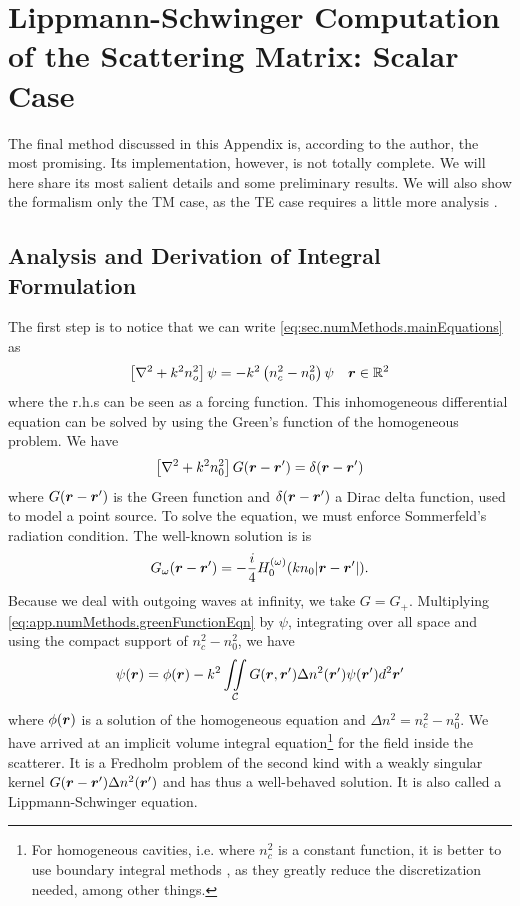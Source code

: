 \section{Lippmann-Schwinger Computation of the Scattering Matrix: Scalar Case}\label{sec:app.numTools.lippmannSchwinger}
The final method discussed in this Appendix is, according to the author, the most
promising. Its implementation, however, is not totally complete. We will here share 
its most salient details and some preliminary results. We will also show the formalism
only the TM case, as the TE case requires a little more analysis \cite{MAR2003}. 

\subsection{Analysis and Derivation of Integral Formulation}
The first step is to notice that we can write \eqref{eq:sec.numMethods.mainEquations} as 
	\begin{align}
		\left[\nabla^2+k^2n_o^2\right]\psi &= -k^2\left(n_c^2-n_0^2\right)\psi & \boldsymbol{r}\in\mathbb{R}^2
	\end{align}
where the r.h.s can be seen as a forcing function. This inhomogeneous differential
equation can be solved by using the Green's function of the homogeneous
problem. We have
	\begin{equation}
		\label{eq:app.numMethods.greenFunctionEqn}
		\left[\nabla^2+k^2n_0^2\right]G(\boldsymbol{r}-\boldsymbol{r}')=\delta(\boldsymbol{r}-\boldsymbol{r}')
	\end{equation}
where $G(\boldsymbol{r}-\boldsymbol{r}')$ is the Green function and
$\delta(\boldsymbol{r}-\boldsymbol{r}')$ a Dirac delta function, used to model
a point source. To solve the equation, we must enforce Sommerfeld's
radiation condition. The well-known solution is \cite{GAG2012} is
	\begin{equation}
		G_\omega(\boldsymbol{r}-\boldsymbol{r}') = -\frac{i}{4}H_0^{(\omega)}(kn_0|\boldsymbol{r}-\boldsymbol{r}'|).
	\end{equation}
Because we deal with outgoing waves at infinity, we take $G=G_+$. 
Multiplying \eqref{eq:app.numMethods.greenFunctionEqn} by $\psi$, 
integrating over all space and using the compact support of 
$n_c^2-n_0^2$, we have
	\begin{equation}
		\psi(\boldsymbol{r}) = \phi(\boldsymbol{r}) - k^2\mathop{\iint}_\mathcal{C} G(\boldsymbol{r},\boldsymbol{r}')\Delta n^2(\boldsymbol{r}')\psi(\boldsymbol{r}')d^2\boldsymbol{r}'
	\end{equation}
where $\phi(\boldsymbol{r})$ is a solution of the homogeneous equation and $\Delta n^2=n_c^2-n_0^2$. 
We have arrived at an implicit volume integral equation\footnote{For homogeneous cavities, i.e. where
$n_c^2$ is a constant function, it is better to use boundary integral methods \cite{WIE2003,BOR2004}, as they greatly reduce
the discretization needed, among other things.} for the field inside the scatterer. 
It is a Fredholm problem of the second kind with a weakly singular kernel $G(\boldsymbol{r}-\boldsymbol{r}')\Delta n^2(\boldsymbol{r}')$ 
\cite{DEL1985} and has thus a well-behaved solution. It is also called a Lippmann-Schwinger equation. 

